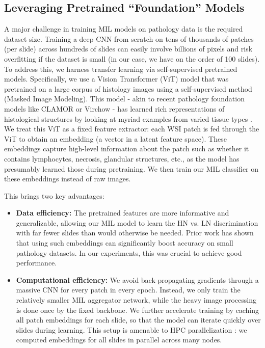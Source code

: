 \subsection{Leveraging Pretrained ``Foundation'' Models}
\label{sec:foundation}
A major challenge in training MIL models on pathology data is the required dataset size. Training a deep CNN from scratch on tens of thousands of patches (per slide) across hundreds of slides can easily involve billions of pixels and risk overfitting if the dataset is small (in our case, we have on the order of 100 slides). To address this, we harness transfer learning via self-supervised pretrained models. Specifically, we use a Vision Transformer (ViT) model that was pretrained on a large corpus of histology images using a self-supervised method (Masked Image Modeling). This model - akin to recent pathology foundation models like CLAMOR or Virchow - has learned rich representations of histological structures by looking at myriad examples from varied tissue types \cite{virchow}. We treat this ViT as a fixed feature extractor: each WSI patch is fed through the ViT to obtain an embedding (a vector in a latent feature space). These embeddings capture high-level information about the patch such as whether it contains lymphocytes, necrosis, glandular structures, etc., as the model has presumably learned those during pretraining. We then train our MIL classifier on these embeddings instead of raw images.

This brings two key advantages:
\begin{itemize}
    \item \textbf{Data efficiency:} The pretrained features are more informative and generalizable, allowing our MIL model to learn the HN vs. LN discrimination with far fewer slides than would otherwise be needed. Prior work has shown that using such embeddings can significantly boost accuracy on small pathology datasets. In our experiments, this was crucial to achieve good performance.
    \item \textbf{Computational efficiency:} We avoid back-propagating gradients through a massive CNN for every patch in every epoch. Instead, we only train the relatively smaller MIL aggregator network, while the heavy image processing is done once by the fixed backbone. We further accelerate training by caching all patch embeddings for each slide, so that the model can iterate quickly over slides during learning. This setup is amenable to HPC parallelization : we computed embeddings for all slides in parallel across many nodes.
\end{itemize}

